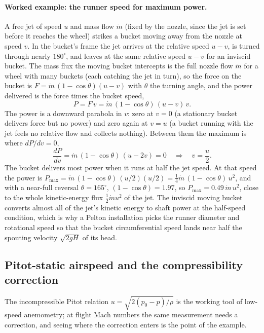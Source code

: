 \paragraph{Worked example: the runner speed for maximum power.} A free
jet of speed $u$ and mass flow $\dot m$ (fixed by the nozzle, since the
jet is set before it reaches the wheel) strikes a bucket moving away
from the nozzle at speed $v$. In the bucket's frame the jet arrives at
the relative speed $u - v$, is turned through nearly $180^\circ$, and
leaves at the same relative speed $u - v$ for an inviscid bucket. The
mass flux the moving bucket intercepts is the full nozzle flow $\dot m$
for a wheel with many buckets (each catching the jet in turn), so the
force on the bucket is $F = \dot m\,(1 - \cos\theta)(u - v)$ with
$\theta$ the turning angle, and the power delivered is the force times
the bucket speed,
\[
P = F\,v = \dot m\,(1 - \cos\theta)\,(u - v)\,v.
\]
The power is a downward parabola in $v$: zero at $v = 0$ (a stationary
bucket delivers force but no power) and zero again at $v = u$ (a bucket
running with the jet feels no relative flow and collects nothing).
Between them the maximum is where $dP/dv = 0$,
\[
\frac{dP}{dv} = \dot m\,(1 - \cos\theta)\,(u - 2v) = 0
\quad\Longrightarrow\quad
v = \frac{u}{2}.
\]
The bucket delivers most power when it runs at half the jet speed. At
that speed the power is $P_\text{max} = \dot m\,(1 - \cos\theta)\,
(u/2)(u/2) = \tfrac14\dot m\,(1 - \cos\theta)\,u^2$, and with a
near-full reversal $\theta = 165^\circ$, $(1 - \cos\theta) = 1.97$, so
$P_\text{max} = 0.49\,\dot m\,u^2$, close to the whole kinetic-energy
flux $\tfrac12\dot m u^2$ of the jet. The inviscid moving bucket
converts almost all of the jet's kinetic energy to shaft power at the
half-speed condition, which is why a Pelton installation picks the
runner diameter and rotational speed so that the bucket circumferential
speed lands near half the spouting velocity $\sqrt{2gH}$ of its head.

\subsection{Pitot-static airspeed and the compressibility correction}

The incompressible Pitot relation $u = \sqrt{2(p_0 - p)/\rho}$ is the
working tool of low-speed anemometry; at flight Mach numbers the same
measurement needs a correction, and seeing where the correction
enters is the point of the example.

